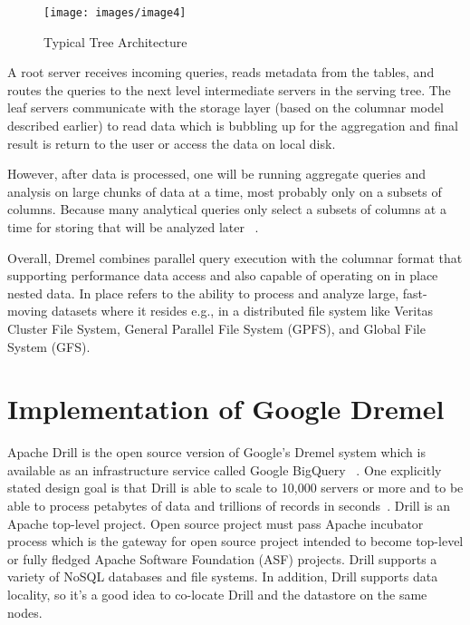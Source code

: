 \documentclass[9pt,twocolumn,twoside]{styles/osajnl}
\begin{document}
\begin{figure}[H]
 \centering
\texttt{[image: images/image4]}
\caption{Typical Tree Architecture ~\cite{book-hadoop}} 
\end{figure}

A root server receives incoming queries, reads metadata from the tables, and routes the queries to the next level intermediate servers in the serving tree. The leaf servers communicate with the storage layer (based on the columnar model described earlier) to read data which is bubbling up for the aggregation and final result is return to the user  or access the data on local disk. 

However, after data is processed, one will be running aggregate queries and analysis on large chunks of data at a time, most probably only on a subsets of columns. Because many analytical queries only select a subsets of columns at a time for storing that will be analyzed later ~\cite{book-hadoop}.

Overall, Dremel combines parallel query execution with the columnar format that supporting  performance data access and also capable of operating on in place nested data. In place refers to the ability to process and analyze large, fast-moving datasets where it resides e.g., in a distributed file system like Veritas Cluster File System,  General Parallel File System (GPFS), and  Global File System (GFS). 

\section{Implementation of Google Dremel }
Apache Drill is the open source version of Google's Dremel system which is available as an infrastructure service called Google BigQuery ~\cite{wiki-radar}. One explicitly stated design goal is that Drill is able to scale to 10,000 servers or more and to be able to process petabytes of data and trillions of records in seconds~\cite{wiki-drill}. Drill is an Apache top-level project. Open source project must pass Apache incubator process which is the gateway for open source project intended to become top-level or fully fledged Apache Software Foundation (ASF) projects.  Drill supports a variety of NoSQL databases and file systems. In addition, Drill supports data locality, so it's a good idea to co-locate Drill and the datastore on the same nodes.
\end{document}
